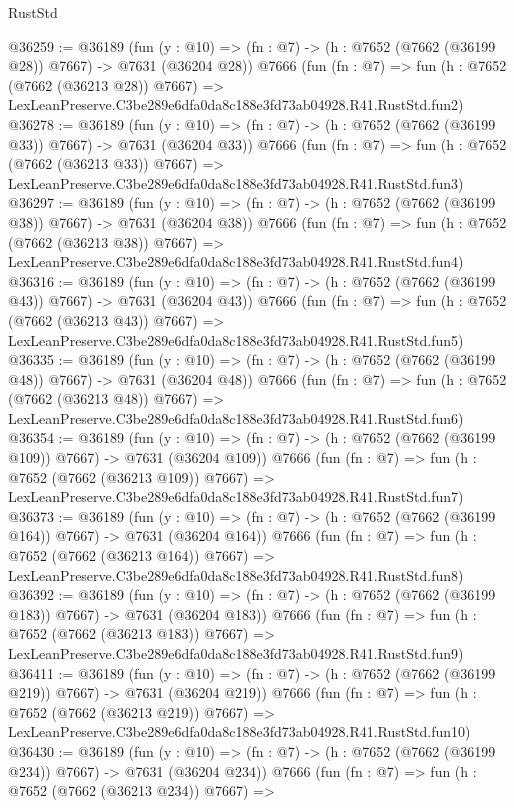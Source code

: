 \begin{lexlean}{RustStd}
\begin{coremodule}
@36259 := @36189
    (fun (y : @10) => (fn : @7) -> (h : @7652 (@7662 (@36199 @28)) @7667) -> @7631 (@36204 @28))
    @7666
    (fun (fn : @7) =>
    fun (h : @7652 (@7662 (@36213 @28)) @7667) =>
    LexLeanPreserve.C3be289e6dfa0da8c188e3fd73ab04928.R41.RustStd.fun2)
@36278 := @36189
    (fun (y : @10) => (fn : @7) -> (h : @7652 (@7662 (@36199 @33)) @7667) -> @7631 (@36204 @33))
    @7666
    (fun (fn : @7) =>
    fun (h : @7652 (@7662 (@36213 @33)) @7667) =>
    LexLeanPreserve.C3be289e6dfa0da8c188e3fd73ab04928.R41.RustStd.fun3)
@36297 := @36189
    (fun (y : @10) => (fn : @7) -> (h : @7652 (@7662 (@36199 @38)) @7667) -> @7631 (@36204 @38))
    @7666
    (fun (fn : @7) =>
    fun (h : @7652 (@7662 (@36213 @38)) @7667) =>
    LexLeanPreserve.C3be289e6dfa0da8c188e3fd73ab04928.R41.RustStd.fun4)
@36316 := @36189
    (fun (y : @10) => (fn : @7) -> (h : @7652 (@7662 (@36199 @43)) @7667) -> @7631 (@36204 @43))
    @7666
    (fun (fn : @7) =>
    fun (h : @7652 (@7662 (@36213 @43)) @7667) =>
    LexLeanPreserve.C3be289e6dfa0da8c188e3fd73ab04928.R41.RustStd.fun5)
@36335 := @36189
    (fun (y : @10) => (fn : @7) -> (h : @7652 (@7662 (@36199 @48)) @7667) -> @7631 (@36204 @48))
    @7666
    (fun (fn : @7) =>
    fun (h : @7652 (@7662 (@36213 @48)) @7667) =>
    LexLeanPreserve.C3be289e6dfa0da8c188e3fd73ab04928.R41.RustStd.fun6)
@36354 := @36189
    (fun (y : @10) => (fn : @7) -> (h : @7652 (@7662 (@36199 @109)) @7667) -> @7631 (@36204 @109))
    @7666
    (fun (fn : @7) =>
    fun (h : @7652 (@7662 (@36213 @109)) @7667) =>
    LexLeanPreserve.C3be289e6dfa0da8c188e3fd73ab04928.R41.RustStd.fun7)
@36373 := @36189
    (fun (y : @10) => (fn : @7) -> (h : @7652 (@7662 (@36199 @164)) @7667) -> @7631 (@36204 @164))
    @7666
    (fun (fn : @7) =>
    fun (h : @7652 (@7662 (@36213 @164)) @7667) =>
    LexLeanPreserve.C3be289e6dfa0da8c188e3fd73ab04928.R41.RustStd.fun8)
@36392 := @36189
    (fun (y : @10) => (fn : @7) -> (h : @7652 (@7662 (@36199 @183)) @7667) -> @7631 (@36204 @183))
    @7666
    (fun (fn : @7) =>
    fun (h : @7652 (@7662 (@36213 @183)) @7667) =>
    LexLeanPreserve.C3be289e6dfa0da8c188e3fd73ab04928.R41.RustStd.fun9)
@36411 := @36189
    (fun (y : @10) => (fn : @7) -> (h : @7652 (@7662 (@36199 @219)) @7667) -> @7631 (@36204 @219))
    @7666
    (fun (fn : @7) =>
    fun (h : @7652 (@7662 (@36213 @219)) @7667) =>
    LexLeanPreserve.C3be289e6dfa0da8c188e3fd73ab04928.R41.RustStd.fun10)
@36430 := @36189
    (fun (y : @10) => (fn : @7) -> (h : @7652 (@7662 (@36199 @234)) @7667) -> @7631 (@36204 @234))
    @7666
    (fun (fn : @7) =>
    fun (h : @7652 (@7662 (@36213 @234)) @7667) =>

\end{coremodule}
\end{lexlean}

